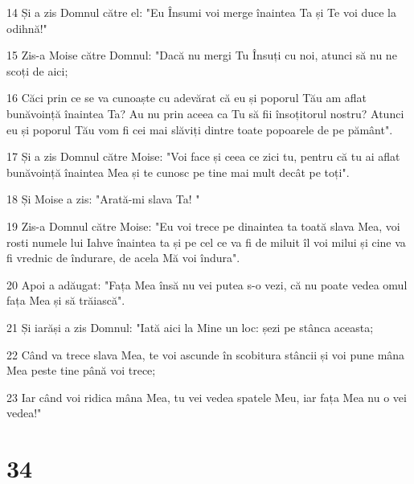 \par 14 Și a zis Domnul către el: "Eu Însumi voi merge înaintea Ta și Te voi duce la odihnă!"
\par 15 Zis-a Moise către Domnul: "Dacă nu mergi Tu Însuți cu noi, atunci să nu ne scoți de aici;
\par 16 Căci prin ce se va cunoaște cu adevărat că eu și poporul Tău am aflat bunăvoință înaintea Ta? Au nu prin aceea ca Tu să fii însoțitorul nostru? Atunci eu și poporul Tău vom fi cei mai slăviți dintre toate popoarele de pe pământ".
\par 17 Și a zis Domnul către Moise: "Voi face și ceea ce zici tu, pentru că tu ai aflat bunăvoință înaintea Mea și te cunosc pe tine mai mult decât pe toți".
\par 18 Și Moise a zis: "Arată-mi slava Ta! "
\par 19 Zis-a Domnul către Moise: "Eu voi trece pe dinaintea ta toată slava Mea, voi rosti numele lui Iahve înaintea ta și pe cel ce va fi de miluit îl voi milui și cine va fi vrednic de îndurare, de acela Mă voi îndura".
\par 20 Apoi a adăugat: "Fața Mea însă nu vei putea s-o vezi, că nu poate vedea omul fața Mea și să trăiască".
\par 21 Și iarăși a zis Domnul: "Iată aici la Mine un loc: șezi pe stânca aceasta;
\par 22 Când va trece slava Mea, te voi ascunde în scobitura stâncii și voi pune mâna Mea peste tine până voi trece;
\par 23 Iar când voi ridica mâna Mea, tu vei vedea spatele Meu, iar fața Mea nu o vei vedea!"

\chapter{34}

